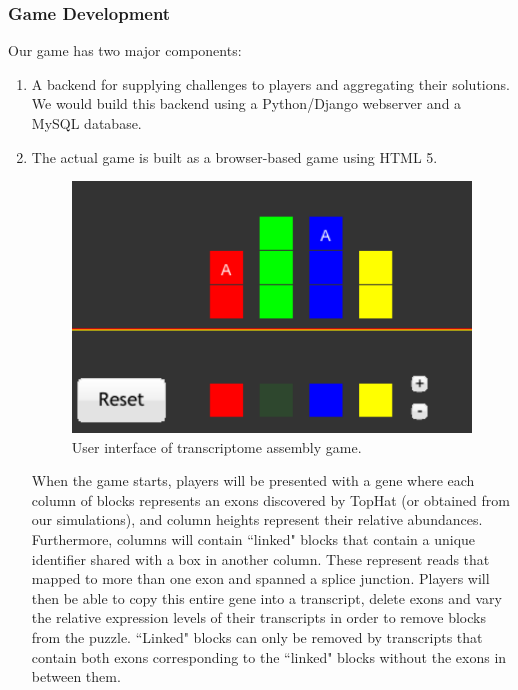 \documentclass[12pt]{article}
\begin{document}
\subsubsection*{Game Development}
Our game has two major components:
\begin{enumerate}
\item A backend for supplying challenges to players and aggregating their solutions. We would build this backend using a Python/Django webserver and a MySQL database.
\item The actual game is built as a browser-based game using HTML 5.

\begin{figure}[H]
\includegraphics[scale=0.5]{gameshot.png}
\caption{User interface of transcriptome assembly game.}
\centering
\label{fig:proposedui}
\end{figure}

When the game starts, players will be presented with a gene where each column of blocks represents an exons discovered by TopHat (or obtained from our simulations), and column heights represent their relative abundances. Furthermore, columns will contain ``linked" blocks that contain a unique identifier shared with a box in another column.
These represent reads that mapped to more than one exon and spanned a splice junction. Players will then be able to copy this entire gene into a transcript, delete exons and vary the relative expression levels of their transcripts in order to remove blocks from the puzzle. ``Linked" blocks can only be removed by
transcripts that contain both exons corresponding to the ``linked" blocks without the exons in between them.


\end{enumerate}
\end{document}
